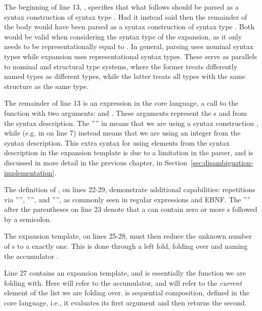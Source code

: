 \documentclass{kththesis}
\begin{document}
The beginning of line 13, , specifies that what follows should be parsed as a syntax construction of syntax type . Had it instead said  then the remainder of the body would have been parsed as a syntax construction of syntax type . Both would be valid when considering the syntax type of the expansion, as it only needs to be representationally equal to . In general, parsing uses nominal syntax types while expansion uses representational syntax types. These serve as parallels to nominal and structural type systems, where the former treats differently named types as different types, while the latter treats all types with the same structure as the same type.

The remainder of line 13 is an expression in the core language, a call to the function  with two arguments:  and . These arguments represent the s  and  from the syntax description. The '''' in  means that we are using a syntax construction , while  (e.g. in  on line 7) instead means that we are using an integer from the syntax description. This extra syntax for using elements from the syntax description in the expansion template is due to a limitation in the parser, and is discussed in more detail in the previous chapter, in Section~\ref{sec:disambiguation-implementation}.

The definition of , on lines 22-29, demonstrate additional capabilities: repetitions via ''\syncon{*}'', ''\syncon{+}'', and '''', as commonly seen in regular expressions and EBNF. The ''\syncon{*}'' after the parentheses on line 23 denote that a  can contain zero or more s followed by a semicolon.

The expansion template, on lines 25-28, must then reduce the unknown number of s to a exactly one. This is done through a left fold, folding over  and naming the accumulator .

Line 27 contains an expansion template, and is essentially the function we are folding with. Here  will refer to the accumulator, and  will refer to the \emph{current} element of the list we are folding over.  is sequential composition, defined in the core language, i.e., it evaluates its first argument and then returns the second.
\end{document}
